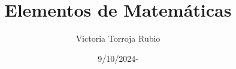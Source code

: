 \documentclass{report}
\begin{document}
\title{Elementos de Matemáticas}
\author{Victoria Torroja Rubio}
\date{9/10/2024-}

\maketitle

\tableofcontents

\pagebreak



\end{document}
